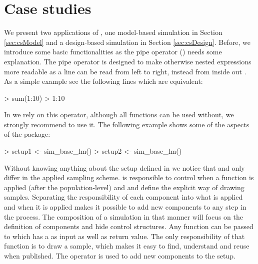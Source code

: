 \documentclass[article]{ajs}
\begin{document}
\section{Case studies}
\label{sec:caseStudy}
We present two applications of , one model-based simulation in Section \ref{sec:csModel} and a design-based simulation in Section \ref{sec:csDesign}. Before, we introduce some basic functionalities as the pipe operator (\proglang{\%>\%}) needs some explanation. The pipe operator is designed to make otherwise nested expressions more readable as a line can be read from left to right, instead from inside out \citep{bache14}. As a simple example see the following lines which are equivalent:

\begin{Schunk}
\begin{Sinput}
> sum(1:10)
> 1:10 %
\end{Sinput}
\end{Schunk}

In  we rely on this operator, although all functions can be used without, we strongly recommend to use it. The following example shows some of the aspects of the package:

\begin{Schunk}
\begin{Sinput}
> setup1 <- sim_base_lm() %
> setup2 <- sim_base_lm() %
\end{Sinput}
\end{Schunk}

Without knowing anything about the setup defined in  we notice that  and  only differ in the applied sampling scheme.  is responsible to control when a function is applied (after the population-level) and  and  define the explicit way of drawing samples. Separating the responsibility of each component into what is applied and when it is applied makes it possible to add new components to any step in the process. The composition of a simulation in that manner will focus on the definition of components and hide control structures. Any function can be passed to  which has a  as input as well as return value. The only responsibility of that function is to draw a sample, which makes it easy to find, understand and reuse when published. The operator \proglang{\%>\%} is used to add new components to the setup. 
\end{document}
